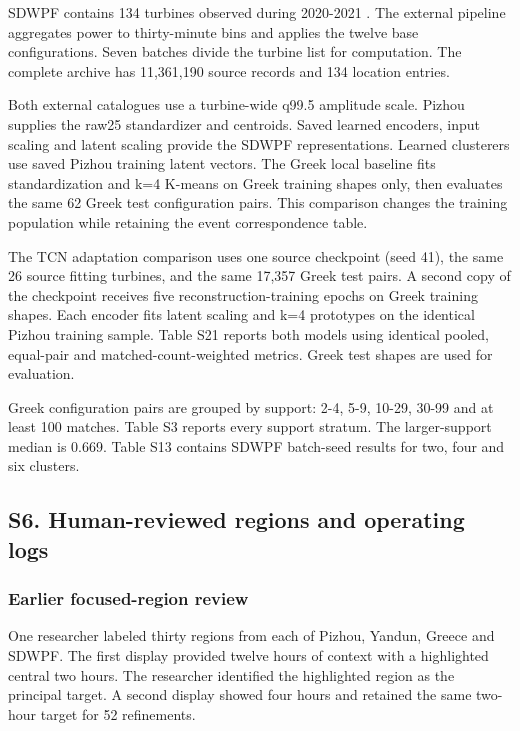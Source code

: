 \documentclass[a4paper,11pt]{article}
\begin{document}
SDWPF contains 134 turbines observed during 2020-2021 \citep{sdwpfdata}. The external pipeline aggregates power to thirty-minute bins and applies the twelve base configurations. Seven batches divide the turbine list for computation. The complete archive has 11,361,190 source records and 134 location entries.

Both external catalogues use a turbine-wide q99.5 amplitude scale. Pizhou supplies the raw25 standardizer and centroids. Saved learned encoders, input scaling and latent scaling provide the SDWPF representations. Learned clusterers use saved Pizhou training latent vectors. The Greek local baseline fits standardization and k=4 K-means on Greek training shapes only, then evaluates the same 62 Greek test configuration pairs. This comparison changes the training population while retaining the event correspondence table.

The TCN adaptation comparison uses one source checkpoint (seed 41), the same 26 source fitting turbines, and the same 17,357 Greek test pairs. A second copy of the checkpoint receives five reconstruction-training epochs on Greek training shapes. Each encoder fits latent scaling and k=4 prototypes on the identical Pizhou training sample. Table S21 reports both models using identical pooled, equal-pair and matched-count-weighted metrics. Greek test shapes are used for evaluation.

Greek configuration pairs are grouped by support: 2-4, 5-9, 10-29, 30-99 and at least 100 matches. Table S3 reports every support stratum. The larger-support median is 0.669. Table S13 contains SDWPF batch-seed results for two, four and six clusters.

\subsection{S6. Human-reviewed regions and operating logs}\label{s6.-human-reviewed-regions-and-operating-logs}

\subsubsection{Earlier focused-region review}\label{earlier-focused-region-review}

One researcher labeled thirty regions from each of Pizhou, Yandun, Greece and SDWPF. The first display provided twelve hours of context with a highlighted central two hours. The researcher identified the highlighted region as the principal target. A second display showed four hours and retained the same two-hour target for 52 refinements.
\end{document}
